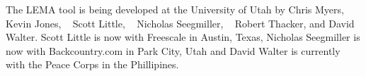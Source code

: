 \documentclass[titlepage,11pt]{article}
\begin{document}
\noindent
The LEMA tool is being developed at the University of Utah
by 
Chris Myers,
~
Kevin Jones,
~
Scott Little,
~
Nicholas Seegmiller,
~
Robert Thacker,
and
David Walter.
Scott Little is now with Freescale in Austin, Texas, Nicholas Seegmiller is now
with Backcountry.com in Park City, Utah and David Walter is currently with the
Peace Corps in the Phillipines.
  
\end{document}
